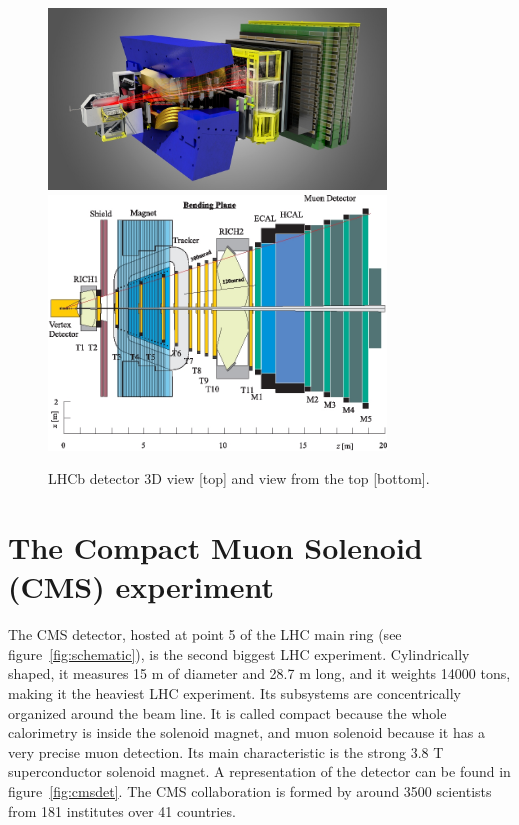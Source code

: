 \begin{figure}[!Hhtbp]
  \begin{center}
    \includegraphics[width=0.8\textwidth]{figs/LHCbDetectorlight1.jpg}
    \includegraphics[width=0.8\textwidth]{figs/LHCb_UpView.jpg}
    \caption{LHCb detector 3D view [top] and view from the top [bottom]. }
    \label{fig:lhcbdet}
  \end{center}
\end{figure}


\section{The Compact Muon Solenoid (CMS) experiment}
\label{sec:CMS}

The CMS detector, hosted at point 5 of the LHC main ring (see figure~\ref{fig:schematic}), is the second biggest LHC experiment. Cylindrically shaped, it measures 15 m of diameter and 28.7 m long, and it weights 14000 tons, making it the heaviest LHC experiment. Its subsystems are concentrically organized around the beam line. It is called compact because the whole calorimetry is inside the solenoid magnet, and muon solenoid because it has a very precise muon detection. Its main characteristic is the strong 3.8 T superconductor solenoid magnet. A representation of the detector can be found in figure~\ref{fig:cmsdet}. The CMS collaboration is formed by around 3500 scientists from 181 institutes over 41 countries. 

